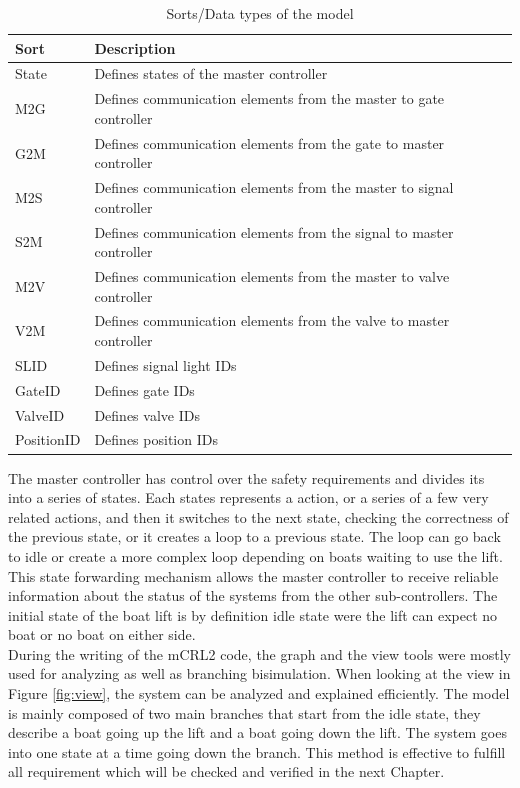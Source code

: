\begin{table}[htbp]
	\centering
	\begin{tabular}{lp{10.5cm}l}
		\toprule
		\textbf{Sort} &  \textbf{Description} \\
		\hline
		State&  Defines states of the master controller \\
		M2G &  Defines communication elements from the master to gate controller\\
		G2M & Defines communication elements from the gate to master controller \\
		M2S &  Defines communication elements from the master to signal controller\\
		S2M &  Defines communication elements from the signal to master controller\\
		M2V &  Defines communication elements from the master to valve controller\\
		V2M &  Defines communication elements from the valve to master controller\\
		SLID &  Defines signal light IDs\\
		GateID &  Defines gate IDs\\
		ValveID &  Defines valve IDs\\
		PositionID   & Defines position IDs\\
		\bottomrule
	\end{tabular}%
		\caption{Sorts/Data types of the model}
	\label{tab:sors}%
\end{table}%
The master controller has control over the safety requirements and divides its into a series of states. Each states represents a action, or a series of a few very related actions, and then it switches to the next state, checking the correctness of the previous state, or it creates a loop to a previous state. The loop can go back to idle or create a more complex loop depending on boats waiting to use the lift. This state forwarding mechanism allows the master controller to receive reliable information about the status of the systems from the other sub-controllers. The initial state of the boat lift is by definition idle state were the lift can expect no boat or no boat on either side.\\
During the writing of the mCRL2 code, the graph and the view tools were mostly used for analyzing as well as branching bisimulation. When looking at the view in Figure \ref{fig:view}, the system can be analyzed and explained efficiently. The model is mainly composed of two main branches that start from the idle state, they describe a boat going up the lift and a boat going down the lift. The system goes into one state at a time going down the branch. This method is effective to fulfill all requirement which will be checked and verified in the next Chapter. 

